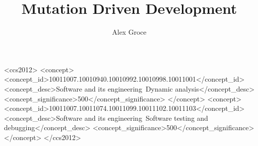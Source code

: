\documentclass[sigplan,screen]{acmart}
\begin{document}
\title{Mutation Driven Development}

\author{Alex Groce}

\renewcommand{\shortauthors}{Alex Groce}

\begin{abstract}

\end{abstract}

\begin{CCSXML}
<ccs2012>
<concept>
<concept_id>10011007.10010940.10010992.10010998.10011001</concept_id>
<concept_desc>Software and its engineering~Dynamic analysis</concept_desc>
<concept_significance>500</concept_significance>
</concept>
<concept>
<concept_id>10011007.10011074.10011099.10011102.10011103</concept_id>
<concept_desc>Software and its engineering~Software testing and debugging</concept_desc>
<concept_significance>500</concept_significance>
</concept>
</ccs2012>
\end{CCSXML}


\end{document}

